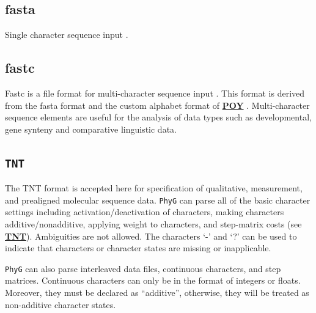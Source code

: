 \documentclass[11pt]{book}
\newcommand{\phyg}{\texttt{PhyG} }
\begin{document}
{{	\subsection{fasta}
		Single character sequence input \citep{PearsonandLipman1988}.
		
	\subsection{fastc}
		Fastc is a file format for multi-character sequence input \citep{WheelerandWashburn2019}.
		This format is derived from the fasta format and the custom alphabet format of 
		 \href{https://github.com/wardwheeler/POY5}{\textbf{POY}} \citep{POY4,POY5}. 
		 Multi-character sequence elements are useful for the analysis of data types such 
		 as developmental, gene synteny and comparative linguistic data.
		
	\subsection{\texttt{TNT}}
		The TNT \citep{Goloboffetal2008} format is accepted here for specification of 
		qualitative, measurement, and prealigned molecular sequence data. \phyg can 
		parse all of the basic character settings including activation/deactivation of 
		characters, making characters additive/nonadditive, applying weight to characters, 
		and step-matrix costs (see \href{http://phylo.wikidot.com/tnt-htm}{\textbf{TNT}}).
		Ambiguities are not allowed. The characters `-' and `?' can be used to indicate
		that characters or character states are missing or inapplicable.
		
		\phyg can also parse interleaved data files, continuous characters, and step matrices.
		Continuous characters can only be in the format of integers or floats. Moreover, 
		they must be declared as ``additive'', otherwise, they will be treated as non-additive 
		character states.
		
}}
\end{document}
